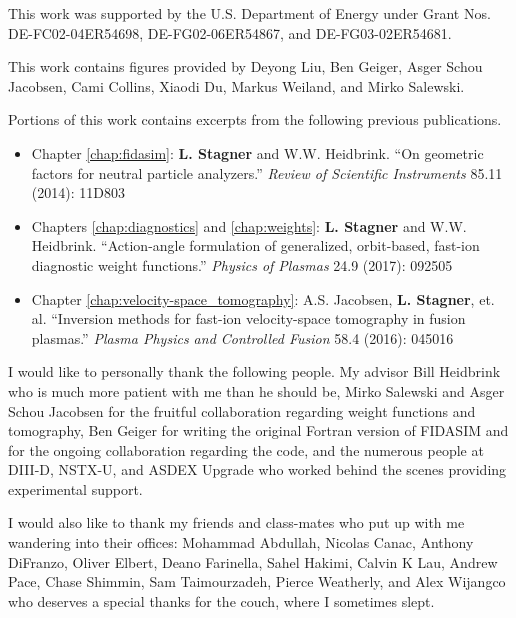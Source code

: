 \acknowledgments
{
This work was supported by the U.S. Department of Energy under Grant Nos. DE-FC02-04ER54698, DE-FG02-06ER54867, and DE-FG03-02ER54681. 

This work contains figures provided by Deyong Liu, Ben Geiger, Asger Schou Jacobsen, Cami Collins, Xiaodi Du, Markus Weiland, and Mirko Salewski.

Portions of this work contains excerpts from the following previous publications.
\begin{itemize}
    \item Chapter \ref{chap:fidasim}: \textbf{L. Stagner} and W.W. Heidbrink. ``On geometric factors for neutral particle analyzers.'' \emph{Review of Scientific Instruments} 85.11 (2014): 11D803
    \item Chapters \ref{chap:diagnostics} and \ref{chap:weights}: \textbf{L. Stagner} and W.W. Heidbrink. ``Action-angle formulation of generalized, orbit-based, fast-ion diagnostic weight functions.'' \emph{Physics of Plasmas} 24.9 (2017): 092505
    \item Chapter \ref{chap:velocity-space_tomography}: A.S. Jacobsen, \textbf{L. Stagner}, et. al. ``Inversion methods for fast-ion velocity-space tomography in fusion plasmas.'' \emph{Plasma Physics and Controlled Fusion} 58.4 (2016): 045016
\end{itemize}

I would like to personally thank the following people. My advisor Bill Heidbrink who is much more patient with me than he should be, Mirko Salewski and Asger Schou Jacobsen for the fruitful collaboration regarding weight functions and tomography, Ben Geiger for writing the original Fortran version of FIDASIM and for the ongoing collaboration regarding the code, and the numerous people at DIII-D, NSTX-U, and ASDEX Upgrade who worked behind the scenes providing experimental support.

I would also like to thank my friends and class-mates who put up with me wandering into their offices: Mohammad Abdullah, Nicolas Canac, Anthony DiFranzo, Oliver Elbert, Deano Farinella, Sahel Hakimi, Calvin K Lau, Andrew Pace, Chase Shimmin, Sam Taimourzadeh, Pierce Weatherly, and Alex Wijangco who deserves a special thanks for the couch, where I sometimes slept.
}


